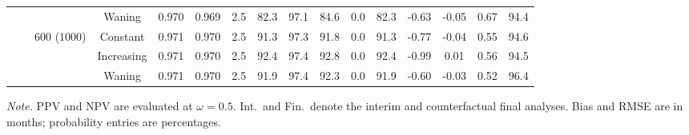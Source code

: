 \begin{table}[!htbp]
{\begin{tabular}[t]{cccccccccccccccc}
 &  &  & Waning & 0.970 & 0.969 & 2.5 & 82.3 & 97.1 & 84.6 & 0.0 & 82.3 & -0.63 & -0.05 & 0.67 & 94.4\\
\cmidrule(l{3pt}r{3pt}){3-3} \cmidrule(l{3pt}r{3pt}){4-4} \cmidrule(l{3pt}r{3pt}){5-6} \cmidrule(l{3pt}r{3pt}){7-10} \cmidrule(l{3pt}r{3pt}){11-12} \cmidrule(l{3pt}r{3pt}){13-16}
 &  & 600 (1000) & Constant & 0.971 & 0.970 & 2.5 & 91.3 & 97.3 & 91.8 & 0.0 & 91.3 & -0.77 & -0.04 & 0.55 & 94.6\\
 &  &  & Increasing & 0.971 & 0.970 & 2.5 & 92.4 & 97.4 & 92.8 & 0.0 & 92.4 & -0.99 & 0.01 & 0.56 & 94.5\\
 &  &  & Waning & 0.971 & 0.970 & 2.5 & 91.9 & 97.4 & 92.3 & 0.0 & 91.9 & -0.60 & -0.03 & 0.52 & 96.4\\
\bottomrule
\end{tabular}}
\par\vspace{2pt}
\begin{minipage}{\linewidth}
\footnotesize\raggedright
\textit{Note.} PPV and NPV are evaluated at $\omega=0.5$. Int.\ and Fin.\ denote the interim and counterfactual final analyses. Bias and RMSE are in months; probability entries are percentages.
\end{minipage}
\end{table}
